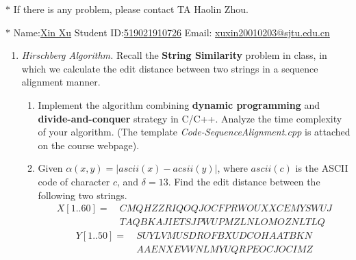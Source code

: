\documentclass[12pt,a4paper]{article}
\theoremstyle{definition}
\begin{document}
\noindent

\noindent{}
\begin{center}
\footnotesize{\color{red}$*$ If there is any problem, please contact TA Haolin Zhou.}

\footnotesize{\color{blue}$*$ Name:\underline{Xin Xu}  \quad Student ID:\underline{519021910726} \quad Email: \underline{xuxin20010203@sjtu.edu.cn}}
\end{center}

\begin{enumerate}
    \item
    \textit{Hirschberg Algorithm.} Recall the \textbf{String Similarity} problem in class, in which we calculate the edit distance between two strings in a sequence alignment manner.
    \begin{enumerate}
    	\item
    	Implement the algorithm combining \textbf{dynamic programming} and \textbf{divide-and-conquer} strategy in C/C++. Analyze the time complexity of your algorithm. {\color{blue}(The template \emph{Code-SequenceAlignment.cpp} is attached on the course webpage)}.
    	
    	\item
    	Given $\alpha(x, y) = |ascii(x) - acsii(y)|$, where $ascii(c)$ is the ASCII code of character $c$, and $\delta=13$. Find the edit distance between the following two strings.
    	\begin{align*}
    		X[1..60]=&\ CMQHZZRIQOQJOCFPRWOUXXCEMYSWUJ\\
    		&\ TAQBKAJIETSJPWUPMZLNLOMOZNLTLQ	
    	\end{align*}
    	\begin{align*}
    		Y[1..50]=&\ SUYLVMUSDROFBXUDCOHAATBKN\\
    		&\ AAENXEVWNLMYUQRPEOCJOCIMZ
    	\end{align*}
    \end{enumerate}


\end{enumerate}
\end{document}
